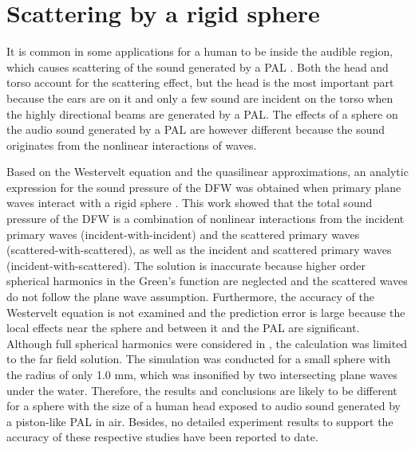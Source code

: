 \section{Scattering by a rigid sphere}
\label{sec:phys_scat}
It is common in some applications for a human to be inside the audible region, which causes scattering of the sound generated by a PAL \cite{Nakashima2005PrototypeParametricArray, Ye2008GenerationAudibleSound}. 
Both the head and torso account for the scattering effect, but the head is the most important part because the ears are on it and only a few sound are incident on the torso when the highly directional beams are generated by a PAL. 
The effects of a sphere on the audio sound generated by a PAL are however different because the sound originates from the nonlinear interactions of waves. 

Based on the Westervelt equation and the quasilinear approximations, an analytic expression for the sound pressure of the DFW was obtained when primary plane waves interact with a rigid sphere \cite{Abbasov1995SphereScatteringNonlinearly}. 
This work showed that the total sound pressure of the DFW is a combination of nonlinear interactions from the incident primary waves (incident-with-incident) and the scattered primary waves (scattered-with-scattered), as well as the incident and scattered primary waves (incident-with-scattered). 
The solution is inaccurate because higher order spherical harmonics in the Green's function are neglected and the scattered waves do not follow the plane wave assumption. 
Furthermore, the accuracy of the Westervelt equation is not examined and the prediction error is large because the local effects near the sphere and between it and the PAL are significant. 
Although full spherical harmonics were considered in \cite{Silva2013DifferencefrequencyGenerationNonlinear}, the calculation was limited to the far field solution. 
The simulation was conducted for a small sphere with the radius of only 1.0 mm, which was insonified by two intersecting plane waves under the water. 
Therefore, the results and conclusions are likely to be different for a sphere with the size of a human head exposed to audio sound generated by a piston-like PAL in air. 
Besides, no detailed experiment results to support the accuracy of these respective studies have been reported to date.

